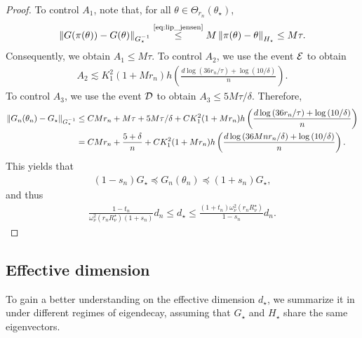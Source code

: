 \begin{proof}
    To control $A_1$, note that, for all $\theta \in \Theta_{r_n}(\theta_\star)$,
    \begin{align*}
        \left\lVert G(\pi(\theta)) - G(\theta) \right\rVert_{G_\star^{-1}} \overset{\mbox{\scriptsize \eqref{eq:lip_jensen}}}{\le} M \left\lVert \pi(\theta) - \theta \right\rVert_{H_\star}
        \le M \tau.
    \end{align*}
    Consequently, we obtain $A_1 \le M \tau$.
    To control $A_2$, we use the event $\mathcal{E}$ to obtain
    \begin{align*}
        A_2 \lesssim K_1^2 (1 + Mr_n) h\left( \frac{d\log{(36 r_n/\tau)} + \log{(10/\delta)}}{n} \right).
    \end{align*}
    To control $A_3$, we use the event $\mathcal{D}$ to obtain $A_3 \le 5M\tau/\delta$.
    Therefore,
    \begin{align*}
        \left\lVert G_n(\theta_n) - G_\star \right\rVert_{G_\star^{-1}}
        &\le CM r_n + M\tau + 5M\tau / \delta + CK_1^2 (1 + Mr_n) h\left( \frac{d\log{(36 r_n/\tau)} + \log{(10/\delta)}}{n} \right) \\
        &= CM r_n + \frac{5+\delta}{n} + CK_1^2 (1 + Mr_n) h\left( \frac{d\log{(36M n r_n/\delta)} + \log{(10/\delta)}}{n} \right).
    \end{align*}
    This yields that
    \begin{align*}
        (1 - s_n) G_\star \preceq G_n(\theta_n) \preceq (1 + s_n) G_\star,
    \end{align*}
    and thus
    \begin{align*}
        \frac{1 - t_n}{\omega_\nu^2(r_n R_\nu^\star)(1 + s_n)} d_n \le d_\star \le \frac{(1 + t_n)\omega_\nu^2(r_n R_\nu^\star)}{1 - s_n} d_n.
    \end{align*}
\end{proof}


\subsection{Effective dimension}
\label{sub:appendix:effect_dim}

To gain a better understanding on the effective dimension $d_\star$, we summarize it in  under different regimes of eigendecay, assuming that $G_\star$ and $H_\star$ share the same eigenvectors.

